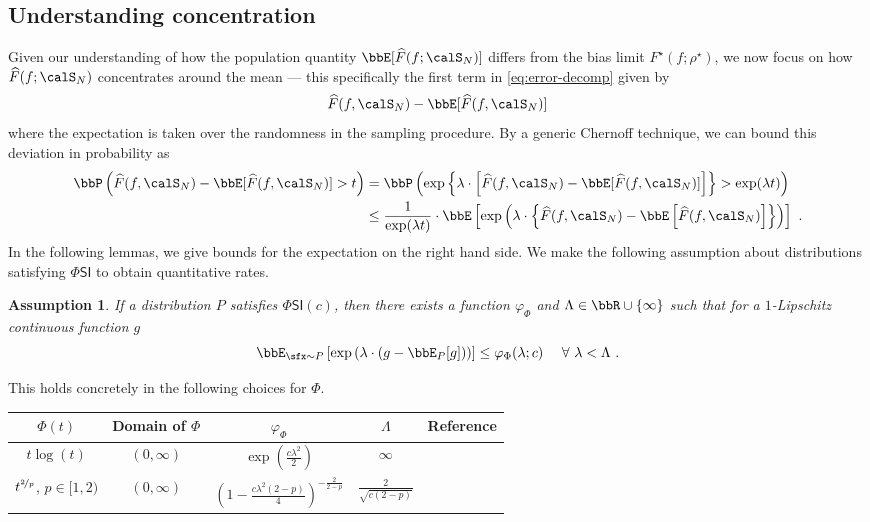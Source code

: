 \documentclass[11pt]{article}
\newcounter{ct}
\newtheorem{assumption}{Assumption}[section]
\newcommand{\PhiSI}[1]{\Phi\mathsf{SI}\left(#1\right)}
\begin{document}
\subsection{Understanding concentration}

Given our understanding of how the population quantity \(\bbE[\widehat{F}(f; \calS_{N})]\) differs from the bias limit \(F^{\star}(f; \rho^{\star})\), we now focus on how \(\widehat{F}(f; \calS_{N})\) concentrates around the mean --- this specifically the first term in \cref{eq:error-decomp} given by
\begin{equation*}
    \widehat{F}(f, \calS_{N}) - \bbE[\widehat{F}(f, \calS_{N})]
\end{equation*}
where the expectation is taken over the randomness in the sampling procedure.
By a generic Chernoff technique, we can bound this deviation in probability as
\begin{align*}
    \bbP\left(\widehat{F}(f, \calS_{N}) - \bbE[\widehat{F}(f, \calS_{N})] > t\right) &= \bbP\left(\exp\left\{\lambda \cdot \left[\widehat{F}(f, \calS_{N}) - \bbE[\widehat{F}(f, \calS_{N})]\right]\right\} > \exp(\lambda t)\right) \\
    &\leq \frac{1}{\exp(\lambda t)} \cdot \bbE\left[\exp\left(\lambda \cdot \left\{\widehat{F}(f, \calS_{N}) - \bbE\left[\widehat{F}(f, \calS_{N})\right]\right\}\right)\right]~.
\end{align*}
In the following lemmas, we give bounds for the expectation on the right hand side.
We make the following assumption about distributions satisfying \(\Phi\mathsf{SI}\) to obtain quantitative rates.
\begin{assumption}
\label{assump:mgf}
If a distribution \(P\) satisfies \(\PhiSI{c}\), then there exists a function \(\varphi_{\Phi}\) and \(\Lambda \in \bbR \cup \{\infty\}\) such that for a \(1\)-Lipschitz continuous function \(g\)
\begin{equation*}
    \bbE_{\sfx \sim P}\left[\exp\left(\lambda \cdot (g - \bbE_{P}[g])\right)\right] \leq \varphi_{\Phi}(\lambda; c)~\quad \forall ~\lambda < \Lambda~.
\end{equation*}
\end{assumption}
This holds concretely in the following choices for \(\Phi\).
\begin{center}
\renewcommand{\arraystretch}{1.5}
\begin{tabular}{ccccc}
\(\Phi(t)\) & Domain of \(\Phi\) & \(\varphi_{\Phi}\) & \(\Lambda\) & Reference \\
\hline
\(t\log(t)\) & \((0, \infty)\) & \(\exp\left(\frac{c\lambda^{2}}{2}\right)\) & \(\infty\) & \citet[Prop. 5.4.1]{bakry2014analysis} \\
\(t^{\nicefrac{2}{p}}\), \(p \in [1, 2)\) & \((0, \infty)\) & \(\left(1 - \frac{c\lambda^{2}(2 - p)}{4}\right)^{-\frac{2}{2 - p}}\) & \(\frac{2}{\sqrt{c(2 - p)}}\) & \citet[Thm. 1]{latala2007between}
\end{tabular}
\end{center}
\end{document}
